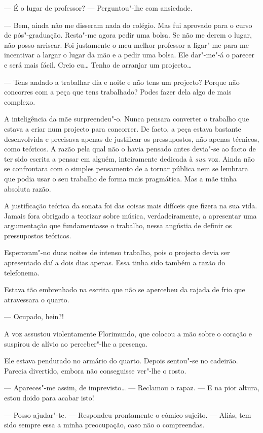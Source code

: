 --- É o lugar de professor? --- Perguntou"-lhe com ansiedade.

--- Bem, ainda não me disseram nada do colégio. Mas fui aprovado para o
curso de pós"-graduação. Resta"-me agora pedir uma bolsa. Se não me derem
o lugar, não posso arriscar. Foi justamente o meu melhor professor a
ligar"-me para me incentivar a largar o lugar da mão e a pedir uma bolsa.
Ele dar"-me"-á o parecer e será mais fácil. Creio eu\ldots{} Tenho de arranjar
um projecto\ldots{}

--- Tens andado a trabalhar dia e noite e não tens um projecto? Porque não
concorres com a peça que tens trabalhado? Podes fazer dela algo de mais
complexo.

A inteligência da mãe surpreendeu"-o. Nunca pensara converter o trabalho
que estava a criar num projecto para concorrer. De facto, a peça estava
bastante desenvolvida e precisava apenas de justificar os pressupostos,
não apenas técnicos, como teóricos. A razão pela qual não o havia
pensado antes devia"-se ao facto de ter sido escrita a pensar em alguém,
inteiramente dedicada à \emph{sua} voz. Ainda não se confrontara com o
simples pensamento de a tornar pública nem se lembrara que podia usar o
seu trabalho de forma mais pragmática. Mas a mãe tinha absoluta razão.

A justificação teórica da sonata foi das coisas mais difíceis que fizera
na sua vida. Jamais fora obrigado a teorizar sobre música,
verdadeiramente, a apresentar uma argumentação que fundamentasse o
trabalho, nessa angústia de definir os pressupostos teóricos.

Esperavam"-no duas noites de intenso trabalho, pois o projecto devia ser
apresentado daí a dois dias apenas. Essa tinha sido também a razão do
telefonema.

Estava tão embrenhado na escrita que não se apercebeu da rajada de frio
que atravessara o quarto.

--- Ocupado, hein?!

A voz assustou violentamente Florimundo, que colocou a mão sobre o
coração e suspirou de alívio ao perceber"-lhe a presença.

Ele estava pendurado no armário do quarto. Depois sentou"-se no cadeirão.
Parecia divertido, embora não conseguisse ver"-lhe o rosto.

--- Apareces"-me assim, de imprevisto\ldots{} --- Reclamou o rapaz. ---  E na pior
altura, estou doido para acabar isto!

--- Posso ajudar"-te. --- Respondeu prontamente o cómico sujeito. --- Aliás,
tem sido sempre essa a minha preocupação, caso não o compreendas.

